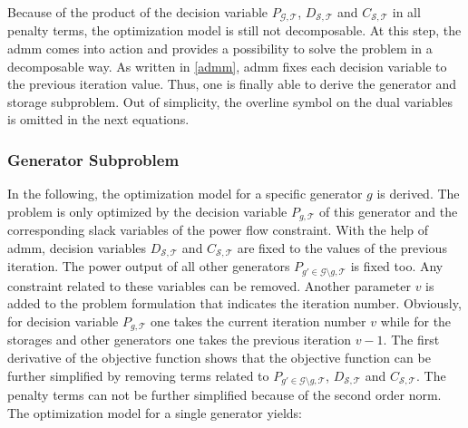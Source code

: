 Because of the product of the decision variable $P_{\mathcal{G},\mathcal{T}}$, $D_{\mathcal{S},\mathcal{T}}$ and $C_{\mathcal{S},\mathcal{T}}$ in all penalty terms, the optimization model is still not decomposable. At this step, the \gls{admm} comes into action and provides a possibility to solve the problem in a decomposable way. As written in \ref{admm}, \gls{admm} fixes each decision variable to the previous iteration value. Thus, one is finally able to derive the generator and storage subproblem. Out of simplicity, the overline symbol on the dual variables is omitted in the next equations.


\subsubsection*{Generator Subproblem}

In the following, the optimization model for a specific generator $g$ is derived. The problem is only optimized by the decision variable $P_{g,\mathcal{T}}$ of this generator and the corresponding slack variables of the power flow constraint. With the help of \gls{admm}, decision variables $D_{\mathcal{S},\mathcal{T}}$ and $C_{\mathcal{S},\mathcal{T}}$ are fixed to the values of the previous iteration. The power output of all other generators $P_{g' \in \mathcal{G}\setminus g,\mathcal{T}}$ is fixed too. Any constraint related to these variables can be removed. Another parameter $v$ is added to the problem formulation that indicates the iteration number. Obviously, for decision variable $P_{g,\mathcal{T}}$ one takes the current iteration number $v$ while for the storages and other generators one takes the previous iteration $v-1$. The first derivative of the objective function shows that the objective function can be further simplified by removing terms related to $P_{g' \in \mathcal{G}\setminus g,\mathcal{T}}$, $D_{\mathcal{S},\mathcal{T}}$ and $C_{\mathcal{S},\mathcal{T}}$. The penalty terms can not be further simplified because of the second order norm. The optimization model for a single generator yields:

